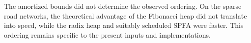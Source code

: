 The amortized bounds did not determine the observed ordering. On the sparse road
networks, the theoretical advantage of the Fibonacci heap did not translate into
speed, while the radix heap and suitably scheduled SPFA were faster. This ordering
remains specific to the present inputs and implementations.
\FloatBarrier
